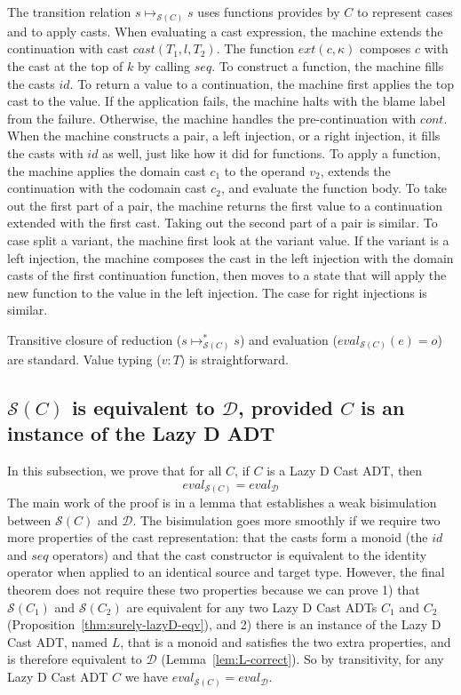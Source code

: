\documentclass[acmsmall,review,anonymous]{acmart}\settopmatter{printfolios=true,printccs=false,printacmref=false}
\newcommand{\judgeType}[2]{#1 : #2}
\newcommand{\judgeSreduce}[3]{#2 \longmapsto_{\mathcal{S}(#1)} #3}
\newcommand{\judgeSreduceTrans}[3]{#2 \longmapsto_{\mathcal{S}(#1)}^{*} #3}
\newcommand{\judgeSeval}[3]{eval_{\mathcal{S}(#1)}(#2) = #3}
\newcommand{\ineffCEKD}{$\mathcal{D}$}
\newcommand{\effCEK}[1]{$\mathcal{S}(#1)$}
\newcommand{\evalEqv}[2]{\ensuremath{eval_{\text{#1}} = eval_{\text{#2}}}}
\begin{document}
The transition relation $\judgeSreduce{C}{s}{s}$ uses functions provides by $C$ 
to represent cases and to apply casts.
%
When evaluating a cast expression, the machine extends the continuation with 
cast $cast(T_1,l,T_2)$. The function $ext(c,\kappa)$ composes $c$ with the cast 
at the top of $k$ by calling $seq$.
%
To construct a function, the machine fills the casts $id$.
%
To return a value to a continuation, the machine first applies the top cast to 
the value. If the application fails, the machine halts with the blame label 
from the failure. Otherwise, the machine handles the pre-continuation with 
$cont$.
%
When the machine constructs a pair, a left injection, or a right injection, it 
fills the casts with $id$ as well, just like how it did for functions. 
%
To apply a function, the machine applies the domain cast $c_1$ to the 
operand $v_2$, extends the continuation with the codomain cast $c_2$, and 
evaluate the function body.
%
To take out the first part of a pair, the machine returns the first value to a 
continuation extended with the first cast. Taking out the second part of a pair 
is similar.
%
To case split a variant, the machine first look at the variant value. If the 
variant is a left injection, the machine composes the cast in the left 
injection with the domain casts of the first continuation function, then moves 
to a state that will apply the new function to the value in the left injection.
The case for right injections is similar.

Transitive closure of reduction ($\judgeSreduceTrans{C}{s}{s}$) and 
evaluation ($\judgeSeval{C}{e}{o}$) are standard. Value typing 
($\judgeType{v}{T}$) is straightforward.

\subsection{\effCEK{C} is equivalent to \ineffCEKD{}, provided $C$ is an instance of the Lazy D ADT}
\label{secc:framework:monoid-correct}

In this subsection, we prove that for all $C$, if $C$ is a Lazy D Cast
ADT, then
\[
  \evalEqv{\effCEK{C}}{\ineffCEKD}
\]
The main work of the proof is in a lemma that establishes a weak
bisimulation between \effCEK{C} and \ineffCEKD{}.  The bisimulation
goes more smoothly if we require two more properties of the cast
representation: that the casts form a monoid (the $id$ and $seq$
operators) and that the cast constructor is equivalent to the identity
operator when applied to an identical source and target type.
However, the final theorem does not require these two properties
because we can prove 1) that \effCEK{C_1} and \effCEK{C_2} are
equivalent for any two Lazy D Cast ADTs $C_1$ and $C_2$
(Proposition~\ref{thm:surely-lazyD-eqv}), and 2) there is an instance
of the Lazy D Cast ADT, named $L$, that is a monoid and satisfies the
two extra properties, and is therefore equivalent to \ineffCEKD{}
(Lemma~\ref{lem:L-correct}). So by transitivity, for any Lazy D Cast
ADT $C$ we have \evalEqv{\effCEK{C}}{\ineffCEKD}.
\end{document}
